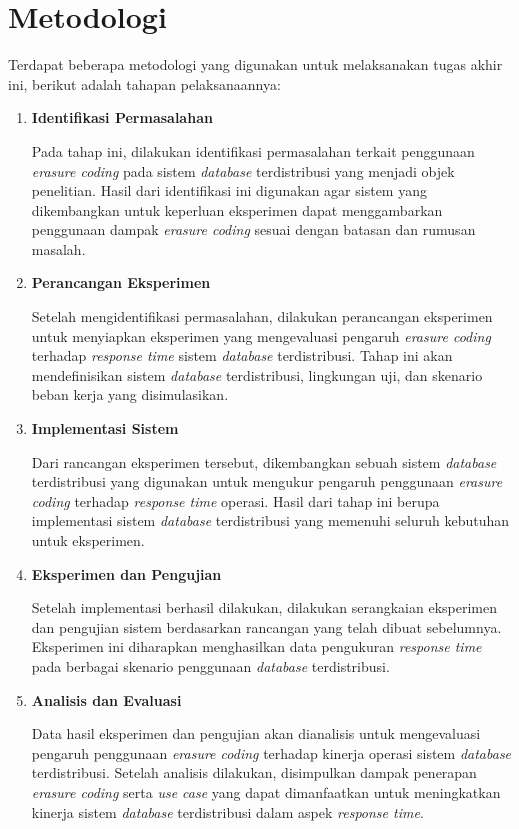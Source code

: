 \section{Metodologi}

Terdapat beberapa metodologi yang digunakan untuk melaksanakan tugas akhir ini, berikut adalah tahapan pelaksanaannya:

\begin{enumerate}
  \item \textbf{Identifikasi Permasalahan}

        Pada tahap ini, dilakukan identifikasi permasalahan terkait penggunaan \textit{erasure coding} pada sistem \textit{database} terdistribusi yang menjadi objek penelitian. Hasil dari identifikasi ini digunakan agar sistem yang dikembangkan untuk keperluan eksperimen dapat menggambarkan penggunaan dampak \textit{erasure coding} sesuai dengan batasan dan rumusan masalah.

  \item \textbf{Perancangan Eksperimen}

        Setelah mengidentifikasi permasalahan, dilakukan perancangan eksperimen untuk menyiapkan eksperimen yang mengevaluasi pengaruh \textit{erasure coding} terhadap \textit{response time} sistem \textit{database} terdistribusi. Tahap ini akan mendefinisikan sistem \textit{database} terdistribusi, lingkungan uji, dan skenario beban kerja yang disimulasikan.

  \item \textbf{Implementasi Sistem}

        Dari rancangan eksperimen tersebut, dikembangkan sebuah sistem \textit{database} terdistribusi yang digunakan untuk mengukur pengaruh penggunaan \textit{erasure coding} terhadap \textit{response time} operasi. Hasil dari tahap ini berupa implementasi sistem \textit{database} terdistribusi yang memenuhi seluruh kebutuhan untuk eksperimen.

\item \textbf{Eksperimen dan Pengujian}

        Setelah implementasi berhasil dilakukan, dilakukan serangkaian eksperimen dan pengujian sistem berdasarkan rancangan yang telah dibuat sebelumnya. Eksperimen ini diharapkan menghasilkan data pengukuran \textit{response time} pada berbagai skenario penggunaan \textit{database} terdistribusi.

\item \textbf{Analisis dan Evaluasi}

        Data hasil eksperimen dan pengujian akan dianalisis  untuk mengevaluasi pengaruh penggunaan \textit{erasure coding} terhadap kinerja operasi sistem \textit{database} terdistribusi. Setelah analisis dilakukan, disimpulkan dampak penerapan \textit{erasure coding} serta \textit{use case} yang dapat dimanfaatkan untuk meningkatkan kinerja sistem \textit{database} terdistribusi dalam aspek \textit{response time}.
        
\end{enumerate}

